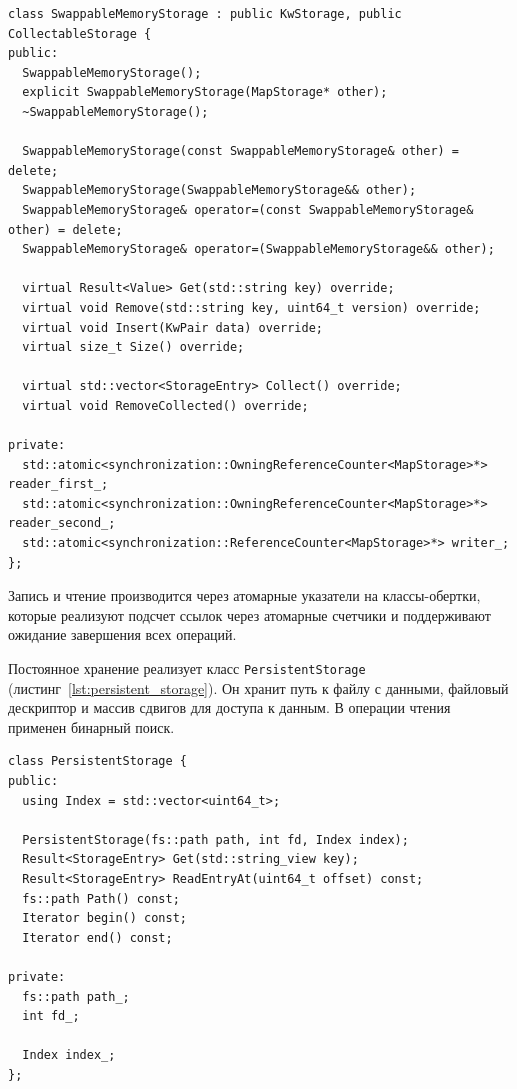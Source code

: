 \documentclass[14pt, russian]{scrartcl}
\newcommand{\refAlgo}[1]{(листинг~\ref{#1})}
\begin{document}
\begin{listing}
  \caption{Объявление класса SwappableMemoryStorage.}
  \label{lst:swappable_memstorage}
  \begin{verbatim}
class SwappableMemoryStorage : public KwStorage, public CollectableStorage {
public:
  SwappableMemoryStorage();
  explicit SwappableMemoryStorage(MapStorage* other);
  ~SwappableMemoryStorage();

  SwappableMemoryStorage(const SwappableMemoryStorage& other) = delete;
  SwappableMemoryStorage(SwappableMemoryStorage&& other);
  SwappableMemoryStorage& operator=(const SwappableMemoryStorage& other) = delete;
  SwappableMemoryStorage& operator=(SwappableMemoryStorage&& other);

  virtual Result<Value> Get(std::string key) override;
  virtual void Remove(std::string key, uint64_t version) override;
  virtual void Insert(KwPair data) override;
  virtual size_t Size() override;

  virtual std::vector<StorageEntry> Collect() override;
  virtual void RemoveCollected() override;

private:
  std::atomic<synchronization::OwningReferenceCounter<MapStorage>*> reader_first_;
  std::atomic<synchronization::OwningReferenceCounter<MapStorage>*> reader_second_;
  std::atomic<synchronization::ReferenceCounter<MapStorage>*> writer_;
};
  \end{verbatim}
\end{listing}

Запись и чтение производится через атомарные указатели на классы-обертки,
которые реализуют подсчет ссылок через атомарные счетчики и поддерживают
ожидание завершения всех операций.


Постоянное хранение реализует класс \verb|PersistentStorage|
\refAlgo{lst:persistent_storage}. Он хранит путь к файлу с данными, файловый
дескриптор и массив сдвигов для доступа к данным. В операции чтения применен
бинарный поиск.

\begin{listing}[H]
  \caption{Объявление класса PersistentStorage.}
  \label{lst:persistent_storage}
  \begin{verbatim}
class PersistentStorage {
public:
  using Index = std::vector<uint64_t>;

  PersistentStorage(fs::path path, int fd, Index index);
  Result<StorageEntry> Get(std::string_view key);
  Result<StorageEntry> ReadEntryAt(uint64_t offset) const;
  fs::path Path() const;
  Iterator begin() const;
  Iterator end() const;

private:
  fs::path path_;
  int fd_;

  Index index_;
};
  \end{verbatim}
\end{listing}
\end{document}
